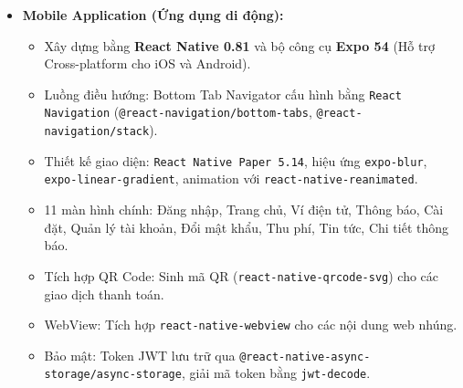 \documentclass[12pt,a4paper]{article}
\begin{document}
\begin{itemize}[leftmargin=*]
    \item \textbf{Mobile Application (Ứng dụng di động):} 
    \begin{itemize}
        \item Xây dựng bằng \textbf{React Native 0.81} và bộ công cụ \textbf{Expo 54} (Hỗ trợ Cross-platform cho iOS và Android).
        \item Luồng điều hướng: Bottom Tab Navigator cấu hình bằng \texttt{React Navigation} (\texttt{@react-navigation/bottom-tabs}, \texttt{@react-navigation/stack}).
        \item Thiết kế giao diện: \texttt{React Native Paper 5.14}, hiệu ứng \texttt{expo-blur}, \texttt{expo-linear-gradient}, animation với \texttt{react-native-reanimated}.
        \item 11 màn hình chính: Đăng nhập, Trang chủ, Ví điện tử, Thông báo, Cài đặt, Quản lý tài khoản, Đổi mật khẩu, Thu phí, Tin tức, Chi tiết thông báo.
        \item Tích hợp QR Code: Sinh mã QR (\texttt{react-native-qrcode-svg}) cho các giao dịch thanh toán.
        \item WebView: Tích hợp \texttt{react-native-webview} cho các nội dung web nhúng.
        \item Bảo mật: Token JWT lưu trữ qua \texttt{@react-native-async-storage/async-storage}, giải mã token bằng \texttt{jwt-decode}.
    \end{itemize}


\end{itemize}
\end{document}
